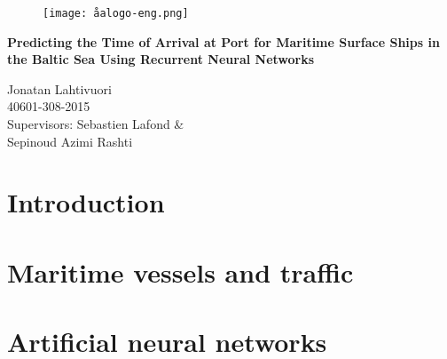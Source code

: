 \documentclass[12pt]{article}
\begin{document}
\begin{titlepage}
\vspace*{20mm}
\begin{figure}[h]
\centering
\texttt{[image: åalogo-eng.png]}
\end{figure}
\begin{center}
	\Huge\textbf{Predicting the Time of Arrival at Port for Maritime Surface Ships in the Baltic Sea Using Recurrent Neural Networks}
\end{center}
\vfill
\begin{flushright}
Jonatan Lahtivuori\\
40601-308-2015\\
Supervisors: Sebastien Lafond \&\\ Sepinoud Azimi Rashti
\end{flushright}
\end{titlepage}




\newpage
\tableofcontents

\newpage
{} %
\section{Introduction}


\newpage
\section{Maritime vessels and traffic}


\newpage
\section{Artificial neural networks}

\end{document}
